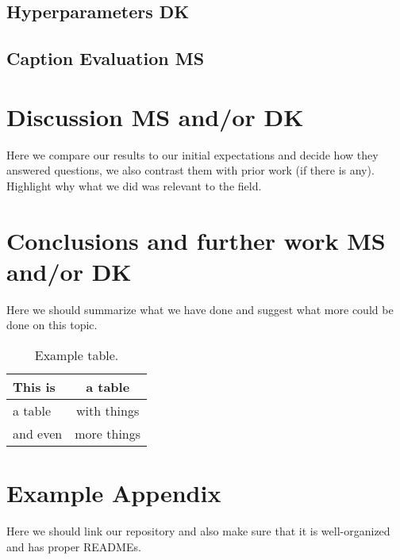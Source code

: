 \documentclass[11pt]{article}
\begin{document}
\subsection{Hyperparameters \textbf{DK}}

\subsection{Caption Evaluation \textbf{MS}}

\section{Discussion \textbf{MS and/or DK}}

Here we compare our results to our initial expectations and decide how they answered questions, we also contrast them with prior work (if there is any). Highlight why what we did was relevant to the field.

\section{Conclusions and further work \textbf{MS and/or DK}}

Here we should summarize what we have done and suggest what more could be done on this topic.

\begin{table}
\centering
\begin{tabular}{lc}
\hline
\textbf{This is} & \textbf{a table}\\
\hline
a table & with things \\
and even & more things  \\\hline
\end{tabular}
\caption{Example table.}
\label{tab:accents}
\end{table}



\appendix

\section{Example Appendix}
\label{sec:appendix}

Here we should link our repository and also make sure that it is well-organized and has proper READMEs.
\end{document}
